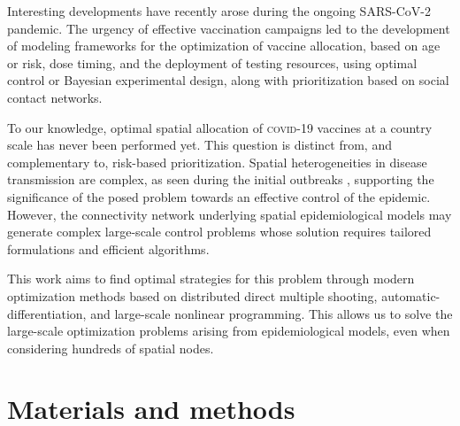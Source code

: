Interesting developments have recently arose during the ongoing SARS-CoV-2 pandemic\cite[-10\baselineskip]{Fitzpatrick:OptimizingAgespecificVaccination:2021, Thul:StochasticOptimizationVaccine:2021,Moore:VaccinationNonPharmaceuticalInterventions:2021}. The urgency of effective vaccination campaigns led to the development of modeling frameworks for the optimization of vaccine allocation, based on age or risk, dose timing\cite[-4\baselineskip]{Saad-Roy:EpidemiologicalEvolutionaryConsiderations:2021, Kadire:DelayedSecondDose:2021}, and the deployment of testing resources, using optimal control\cite{Acemoglu:OptimalAdaptiveTesting:2021} or Bayesian experimental design\cite{Chatzimanolakis:OptimalAllocationLimited:2020}, along with prioritization based on social contact networks\cite{Chen:PrioritizingAllocationCOVID19:2021}. 

To our knowledge, optimal spatial allocation of \textsc{covid}-19 vaccines at a country scale has never been performed yet. This question is distinct from, and complementary to, risk-based prioritization. Spatial heterogeneities in disease transmission are complex, as seen during the initial outbreaks%
, supporting the significance of the posed problem towards an effective control of the epidemic. However, the connectivity network underlying spatial epidemiological models may generate complex large-scale control problems whose solution requires tailored formulations and efficient algorithms.  

This work aims to find optimal strategies for this problem through modern optimization methods based on distributed direct multiple shooting, automatic-differentiation, and large-scale nonlinear programming\cite{Bock:MultipleShootingAlgorithm:1984,Savorgnan:MultipleShootingDistributed:2011,Andersson:CasADiSoftwareFramework:2018,Wachter:ImplementationInteriorpointFilter:2006}. This allows us to solve the large-scale optimization problems arising from epidemiological models, even when considering hundreds of spatial nodes. 


\section{Materials and methods} \label{sec:matmet}

